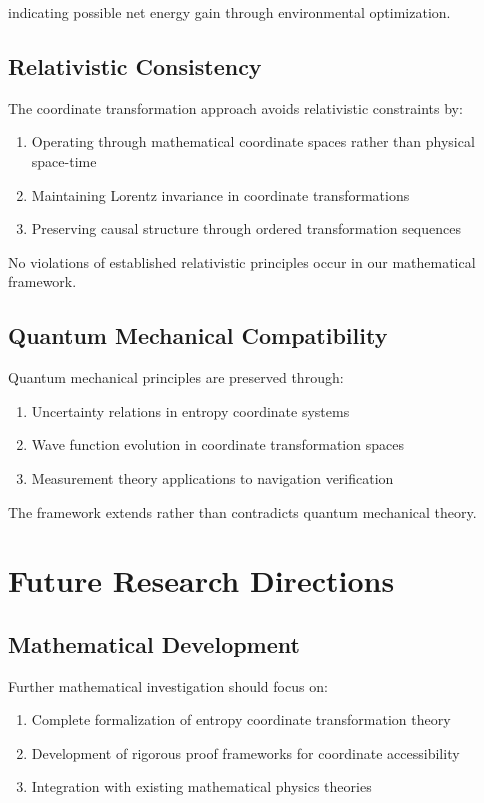 \documentclass[12pt,a4paper]{article}
\begin{document}
indicating possible net energy gain through environmental optimization.

\subsection{Relativistic Consistency}

The coordinate transformation approach avoids relativistic constraints by:

\begin{enumerate}
\item Operating through mathematical coordinate spaces rather than physical space-time
\item Maintaining Lorentz invariance in coordinate transformations  
\item Preserving causal structure through ordered transformation sequences
\end{enumerate}

No violations of established relativistic principles occur in our mathematical framework.

\subsection{Quantum Mechanical Compatibility}

Quantum mechanical principles are preserved through:

\begin{enumerate}
\item Uncertainty relations in entropy coordinate systems
\item Wave function evolution in coordinate transformation spaces
\item Measurement theory applications to navigation verification
\end{enumerate}

The framework extends rather than contradicts quantum mechanical theory.

\section{Future Research Directions}

\subsection{Mathematical Development}

Further mathematical investigation should focus on:

\begin{enumerate}
\item Complete formalization of entropy coordinate transformation theory
\item Development of rigorous proof frameworks for coordinate accessibility
\item Integration with existing mathematical physics theories
\end{enumerate}
\end{document}
